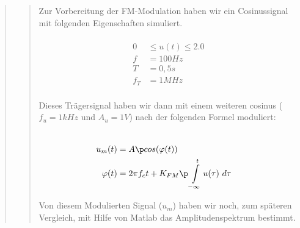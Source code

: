 \begin{quote}
\begin{quote}
        
        Zur Vorbereitung der FM-Modulation haben wir ein Cosinussignal mit folgenden Eigenschaften simuliert.
        
        \begin{equation*}
        \begin{split}
        \\
                 0 &\leq u(t) \leq 2.0
        \\
                 f &= \si{100}{Hz}
        \\
                 T &= \si{0,5}{s}
        \\
               f_T &= \si{1}{MHz}
        \\
        \end{split}
        \end{equation*}
        
        
        Dieses Trägersignal haben wir dann mit einem weiteren cosinus ($f_u = 1kHz$ und $A_u = 1V$) nach der folgenden Formel
        moduliert:
        
        \begin{equation*}
        \begin{split}
        \\
                u_m(t) &= A \p cos(\varphi(t))
        \\
            \varphi(t) &= 2 \pi f_c t + K_{FM} \p \int\limits_{-\infty}^t u(\tau) \ d\tau  
        \\
        \end{split}
        \end{equation*}
        
        Von diesem Modulierten Signal ($u_m$) haben wir noch, zum späteren Vergleich, mit Hilfe von Matlab das Amplitudenspektrum
        bestimmt.
        
        
    \end{quote}
    
    

\end{quote}
